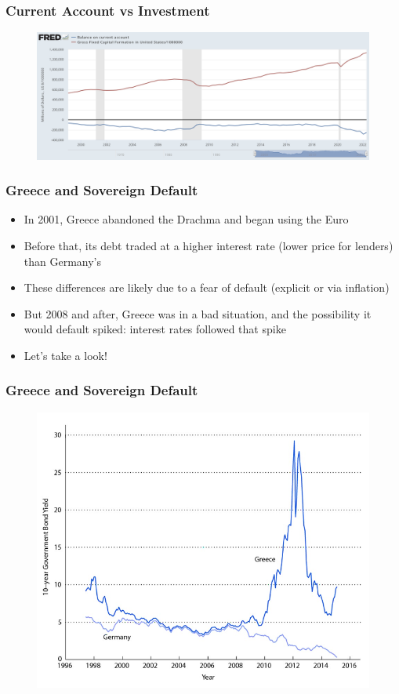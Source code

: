 \documentclass{beamer}
\begin{document}
\begin{frame}
\frametitle[alignment=center]{Current Account vs Investment}
\begin{figure}
\centering
\includegraphics[scale=0.27]{Figures/CurrentAccount.png}
\end{figure}
\end{frame}

\begin{frame}
\frametitle[alignment=center]{Greece and Sovereign Default}
\begin{itemize}
\item In 2001, Greece abandoned the Drachma and began using the Euro
\bigskip
\item Before that, its debt traded at a higher interest rate (lower price for lenders) than Germany's
\bigskip
\item These differences are likely due to a fear of default (explicit or via inflation)
\bigskip
\item But 2008 and after, Greece was in a bad situation, and the possibility it would default spiked: interest rates followed that spike 
\bigskip
\item Let's take a look!
\end{itemize}
\end{frame}


\begin{frame}
\frametitle[alignment=center]{Greece and Sovereign Default}
\begin{figure}
\centering
\includegraphics[scale=0.7]{Figures/W_Fig_16pt5.png}
\end{figure}
\end{frame}
\end{document}
